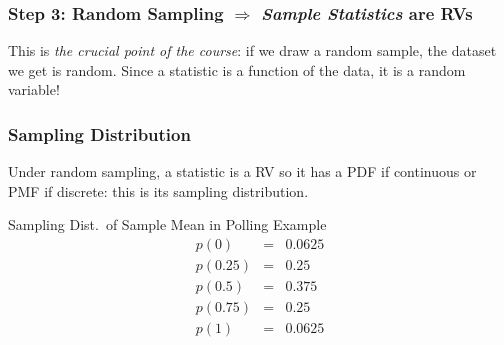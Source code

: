 \begin{frame}
  \frametitle{Step 3: Random Sampling $\Rightarrow$ \emph{Sample Statistics} are RVs} 

  \alert{This is \emph{the crucial point of the course}: if we draw a random sample, the dataset we get is random. Since a statistic is a function of the data, it is a random variable!} 
\end{frame}
%
%
\begin{frame}
  \frametitle{Sampling Distribution}
  Under random sampling, a statistic is a RV so it has a PDF if continuous or PMF if discrete: this is its \alert{sampling distribution}. 

  \begin{block}{Sampling Dist.\ of Sample Mean in Polling Example}
   \begin{eqnarray*}
   p(0) &=&  0.0625\\
   p(0.25) &=&  0.25\\ 
   p(0.5) &=&  0.375\\
   p(0.75)&=& 0.25\\ 
   p(1) &=&  0.0625
   \end{eqnarray*}

  \end{block}
\end{frame}
